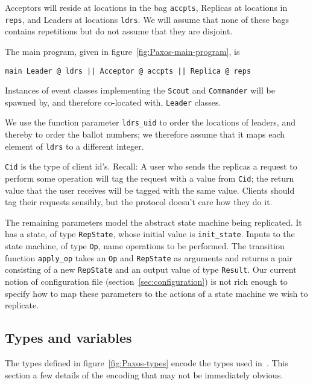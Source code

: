 \documentclass[final]{article}
\begin{document}
Acceptors will reside at locations in the bag \lstinline{accpts},
Replicas at locations in \lstinline{reps}, and Leaders at locations
\lstinline{ldrs}.  We will assume that none of these bags contains
repetitions but do not assume that they are disjoint.

The main program, given in figure~\ref{fig:Paxos-main-program}, is
\begin{emlcode}
\begin{lstlisting}
main Leader @ ldrs || Acceptor @ accpts || Replica @ reps
\end{lstlisting}
\end{emlcode}
Instances of event classes implementing the \lstinline{Scout} and
\lstinline{Commander} will be spawned by, and therefore co-located
with, \lstinline{Leader} classes.

We use the function parameter \lstinline{ldrs_uid} to order the
locations of leaders, and thereby to order the ballot numbers; we
therefore assume that it maps each element of \lstinline{ldrs} to a
different integer.

\lstinline{Cid} is the type of client id's.  Recall: A user who sends
the replicas a request to perform some operation will tag the request
with a value from \lstinline{Cid}; the return value that the user
receives will be tagged with the same value.  Clients should tag their
requests sensibly, but the protocol doesn't care how they do it.

The remaining parameters model the abstract state machine being
replicated.  It has a state, of type \lstinline{RepState}, whose
initial value is \lstinline{init_state}.  Inputs to the state machine,
of type \lstinline{Op}, name operations to be performed.  The
transition function \lstinline{apply_op} takes an \lstinline{Op} and
\lstinline{RepState} as arguments and returns a pair consisting of a
new \lstinline{RepState} and an output value of type
\lstinline{Result}.  Our current notion of configuration file
(section~\ref{sec:configuration}) is not rich enough to specify how to
map these parameters to the actions of a state machine we wish to
replicate.

\subsection{Types and variables}\label{sec:types-variables}

The types defined in figure~\ref{fig:Paxos-types} encode the types
used in~\cite{VanRenesse:2011}.  This section a few details of the
encoding that may not be immediately obvious.
\end{document}

